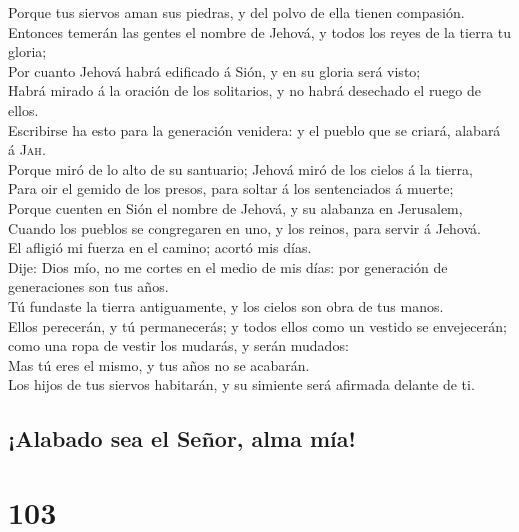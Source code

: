  Porque tus siervos aman sus piedras, y del polvo de ella
tienen compasión.\\
 Entonces temerán las gentes el nombre de Jehová, y todos
los reyes de la tierra tu gloria;\\
 Por cuanto Jehová habrá edificado á Sión, y en su gloria
será visto;\\
 Habrá mirado á la oración de los solitarios, y no habrá
desechado el ruego de ellos.\\
 Escribirse ha esto para la generación venidera: y el
pueblo que se criará, alabará á \textsc{Jah}.\\
 Porque miró de lo alto de su santuario; Jehová miró de
los cielos á la tierra,\\
 Para oir el gemido de los presos, para soltar á los
sentenciados á muerte;\\
 Porque cuenten en Sión el nombre de Jehová, y su
alabanza en Jerusalem,\\
 Cuando los pueblos se congregaren en uno, y los reinos,
para servir á Jehová.\\
 El afligió mi fuerza en el camino; acortó mis días.\\
 Dije: Dios mío, no me cortes en el medio de mis días:
por generación de generaciones son tus años.\\
 Tú fundaste la tierra antiguamente, y los cielos son
obra de tus manos.\\
 Ellos perecerán, y tú permanecerás; y todos ellos como
un vestido se envejecerán; como una ropa de vestir los mudarás, y serán
mudados:\\
 Mas tú eres el mismo, y tus años no se acabarán.\\
 Los hijos de tus siervos habitarán, y su simiente será
afirmada delante de ti.

\hypertarget{alabado-sea-el-seuxf1or-alma-muxeda}{%
\subsection{¡Alabado sea el Señor, alma
mía!}\label{alabado-sea-el-seuxf1or-alma-muxeda}}

\hypertarget{section-19-103}{%
\section{103}\label{section-19-103}}

